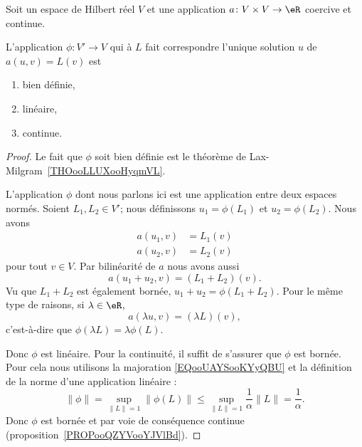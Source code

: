 \begin{proposition} \label{PROPooFEOZooTNPcBJ}
	Soit un espace de Hilbert réel \( V\) et une application \( a\colon V\times V\to \eR\) coercive et continue.

	L'application \( \phi\colon V'\to V\) qui à \( L\) fait correspondre l'unique solution \( u\) de \( a(u,v)=L(v)\) est
	\begin{enumerate}
		\item
		      bien définie,
		\item
		      linéaire,
		\item
		      continue.
	\end{enumerate}
\end{proposition}

\begin{proof}
	Le fait que \( \phi\) soit bien définie est le théorème de Lax-Milgram~\ref{THOooLLUXooHyqmVL}.

	L'application \( \phi\) dont nous parlons ici est une application entre deux espaces normés. Soient \( L_1,L_2\in V'\); nous définissons \( u_1=\phi(L_1)\) et \( u_2=\phi(L_2)\). Nous avons
	\begin{subequations}
		\begin{align}
			a(u_1,v) & =L_1(v) \\
			a(u_2,v) & =L_2(v)
		\end{align}
	\end{subequations}
	pour tout \( v\in V\). Par bilinéarité de \( a\) nous avons aussi
	\begin{equation}
		a(u_1+u_2,v)=(L_1+L_2)(v).
	\end{equation}
	Vu que \( L_1+L_2\) est également bornée, \( u_1+u_2=\phi(L_1+L_2)\). Pour le même type de raisons, si \( \lambda\in \eR\),
	\begin{equation}
		a(\lambda u,v)=(\lambda L)(v),
	\end{equation}
	c'est-à-dire que \( \phi(\lambda L)=\lambda \phi(L)\).

	Donc \( \phi\) est linéaire. Pour la continuité, il suffit de s'assurer que \( \phi\) est bornée. Pour cela nous utilisons la majoration \eqref{EQooUAYSooKYyQBU} et la définition de la norme d'une application linéaire :
	\begin{equation}
		\| \phi \|=\sup_{\| L \|=1}\| \phi(L) \|\leq \sup_{\| L \|=1}\frac{1}{ \alpha }\| L \|=\frac{1}{ \alpha }.
	\end{equation}
	Donc \( \phi\) est bornée et par voie de conséquence continue (proposition~\ref{PROPooQZYVooYJVlBd}).
\end{proof}

